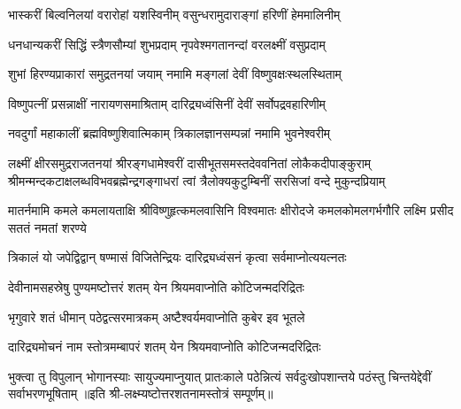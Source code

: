 \twolineshloka
{भास्करीं बिल्वनिलयां वरारोहां यशस्विनीम्}
{वसुन्धरामुदाराङ्गां हरिणीं हेममालिनीम्}

\twolineshloka
{धनधान्यकरीं सिद्धिं स्त्रैणसौम्यां शुभप्रदाम्}
{नृपवेश्मगतानन्दां वरलक्ष्मीं वसुप्रदाम्}

\twolineshloka
{शुभां हिरण्यप्राकारां समुद्रतनयां जयाम्}
{नमामि मङ्गलां देवीं विष्णुवक्षःस्थलस्थिताम्}

\twolineshloka
{विष्णुपत्नीं प्रसन्नाक्षीं नारायणसमाश्रिताम्}
{दारिद्र्यध्वंसिनीं देवीं सर्वोपद्रवहारिणीम्}

\twolineshloka
{नवदुर्गां महाकालीं ब्रह्मविष्णुशिवात्मिकाम्}
{त्रिकालज्ञानसम्पन्नां नमामि भुवनेश्वरीम्}

\fourlineindentedshloka
{लक्ष्मीं क्षीरसमुद्रराजतनयां श्रीरङ्गधामेश्वरीं}
{दासीभूतसमस्तदेववनितां लोकैकदीपाङ्कुराम्}
{श्रीमन्मन्दकटाक्षलब्धविभवब्रह्मेन्द्रगङ्गाधरां}
{त्वां त्रैलोक्यकुटुम्बिनीं सरसिजां वन्दे मुकुन्दप्रियाम्}

\fourlineindentedshloka
{मातर्नमामि कमले कमलायताक्षि}
{श्रीविष्णुहृत्कमलवासिनि विश्वमातः}
{क्षीरोदजे कमलकोमलगर्भगौरि}
{लक्ष्मि प्रसीद सततं नमतां शरण्ये}

\twolineshloka
{त्रिकालं यो जपेद्विद्वान् षण्मासं विजितेन्द्रियः}
{दारिद्र्यध्वंसनं कृत्वा सर्वमाप्नोत्ययत्नतः}

\twolineshloka
{देवीनामसहस्रेषु पुण्यमष्टोत्तरं शतम्}
{येन श्रियमवाप्नोति कोटिजन्मदरिद्रितः}

\twolineshloka
{भृगुवारे शतं धीमान् पठेद्वत्सरमात्रकम्}
{अष्टैश्वर्यमवाप्नोति कुबेर इव भूतले}

\twolineshloka
{दारिद्र्यमोचनं नाम स्तोत्रमम्बापरं शतम्}
{येन श्रियमवाप्नोति कोटिजन्मदरिद्रितः}

\threelineshloka
{भुक्त्वा तु विपुलान् भोगानस्याः सायुज्यमाप्नुयात्}
{प्रातःकाले पठेन्नित्यं सर्वदुःखोपशान्तये}
{पठंस्तु चिन्तयेद्देवीं सर्वाभरणभूषिताम्}
॥इति श्री-लक्ष्म्यष्टोत्तरशतनामस्तोत्रं सम्पूर्णम्॥